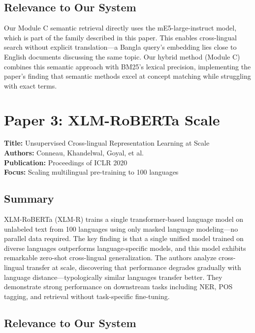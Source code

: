 \documentclass[12pt,a4paper]{report}
\begin{document}
\subsection*{Relevance to Our System}

Our Module C semantic retrieval directly uses the mE5-large-instruct model, which is part of the family described in this paper. This enables cross-lingual search without explicit translation---a Bangla query's embedding lies close to English documents discussing the same topic. Our hybrid method (Module C) combines this semantic approach with BM25's lexical precision, implementing the paper's finding that semantic methods excel at concept matching while struggling with exact terms.

\vspace{0.5cm}

\section{Paper 3: XLM-RoBERTa Scale}

\textbf{Title:} Unsupervised Cross-lingual Representation Learning at Scale \\
\textbf{Authors:} Conneau, Khandelwal, Goyal, et al. \\
\textbf{Publication:} Proceedings of ICLR 2020 \\
\textbf{Focus:} Scaling multilingual pre-training to 100 languages

\subsection*{Summary}

XLM-RoBERTa (XLM-R) trains a single transformer-based language model on unlabeled text from 100 languages using only masked language modeling---no parallel data required. The key finding is that a single unified model trained on diverse languages outperforms language-specific models, and this model exhibits remarkable zero-shot cross-lingual generalization. The authors analyze cross-lingual transfer at scale, discovering that performance degrades gradually with language distance---typologically similar languages transfer better. They demonstrate strong performance on downstream tasks including NER, POS tagging, and retrieval without task-specific fine-tuning.

\subsection*{Relevance to Our System}
\end{document}
